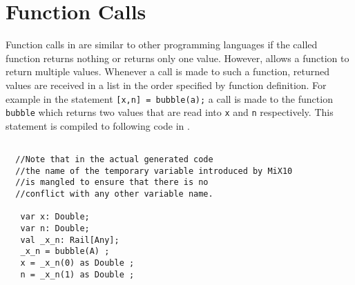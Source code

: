 %
   
\section{Function Calls}

Function calls in \matlab are similar to other programming languages if
the called function returns nothing or returns only one value. However,
\matlab allows a function to return multiple values.
Whenever a call is made to such a function, returned values are received
in a list in the order specified by function definition. For example in
the statement \verb|[x,n] = bubble(a);| a call is made to the function
\verb|bubble| which returns two values that are read into \verb|x| and
\verb|n| respectively. This statement is compiled to following code in
\xten.

\begin{lstlisting}[language=X10,numbers=none]
  
  //Note that in the actual generated code
  //the name of the temporary variable introduced by MiX10
  //is mangled to ensure that there is no 
  //conflict with any other variable name. 
  
   var x: Double;
   var n: Double;
   val _x_n: Rail[Any];
   _x_n = bubble(A) ;
   x = _x_n(0) as Double ;
   n = _x_n(1) as Double ;
\end{lstlisting}

